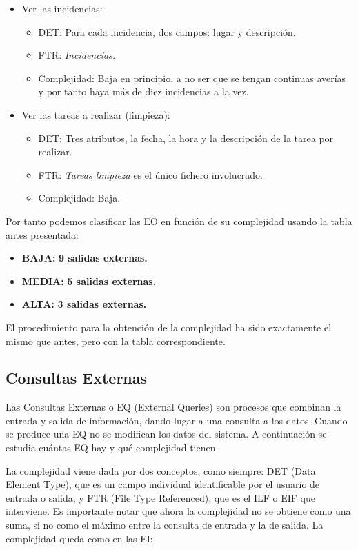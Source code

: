 \documentclass[spanish,a4paper,11pt, twoside]{report}	%
\begin{document}
\begin{itemize}
\begin{itemize}
		\end{itemize}
		\item{Ver las incidencias:} 
		\begin{itemize}
 			\item{DET:} Para cada incidencia, dos campos: lugar y descripción.
			\item{FTR:} \textit{Incidencias.}
			\item{Complejidad:} Baja en principio, a no ser que se tengan continuas averías y por tanto haya más de diez incidencias a la vez.
		\end{itemize}
		\item{Ver las tareas a realizar (limpieza):} 
		\begin{itemize}
 			\item{DET:} Tres atributos, la fecha, la hora y la descripción de la tarea por realizar.
			\item{FTR:} \textit{Tareas limpieza} es el único fichero involucrado.
			\item{Complejidad:} Baja.
		\end{itemize}	
	\end{itemize}

	Por tanto podemos clasificar las EO en función de su complejidad usando la tabla antes presentada:
	\begin{itemize}
	\item{\textbf{BAJA:}} \textbf{9 salidas externas.}
	\item{\textbf{MEDIA:}} \textbf{5 salidas externas.}
	\item{\textbf{ALTA:}} \textbf{3 salidas externas.}
	\end{itemize}

	El procedimiento para la obtención de la complejidad ha sido exactamente el mismo que antes, pero con la tabla correspondiente.

	\subsection{Consultas Externas}
	Las Consultas Externas o EQ (External Queries) son procesos que combinan la entrada y salida de información, dando lugar a una consulta a los datos. Cuando se produce una EQ no se modifican los datos del sistema. A continuación se estudia cuántas EQ hay y qué complejidad tienen. 

	La complejidad viene dada por dos conceptos, como siempre: DET (Data Element Type), que es un campo individual identificable por el usuario de entrada o salida, y FTR (File Type Referenced), que es el ILF o EIF que interviene. Es importante notar que ahora la complejidad no se obtiene como una suma, si no como el máximo entre la consulta de entrada y la de salida. La complejidad queda como en las EI: 
\end{document}
